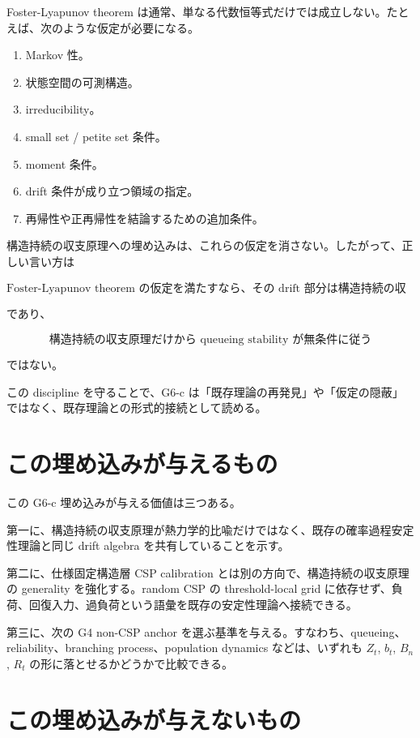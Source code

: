 \documentclass[12pt,a4paper]{article}
\begin{document}
Foster-Lyapunov theorem は通常、単なる代数恒等式だけでは成立しない。たとえば、次のような仮定が必要になる。

\begin{enumerate}
\def\labelenumi{\arabic{enumi}.}
\tightlist
\item
  Markov 性。
\item
  状態空間の可測構造。
\item
  irreducibility。
\item
  small set / petite set 条件。
\item
  moment 条件。
\item
  drift 条件が成り立つ領域の指定。
\item
  再帰性や正再帰性を結論するための追加条件。
\end{enumerate}

構造持続の収支原理への埋め込みは、これらの仮定を消さない。したがって、正しい言い方は

\[
\text{Foster-Lyapunov theorem の仮定を満たすなら、その drift 部分は構造持続の収支原理へ埋め込める}
\]

であり、

\[
\text{構造持続の収支原理だけから queueing stability が無条件に従う}
\]

ではない。

この discipline を守ることで、G6-c は「既存理論の再発見」や「仮定の隠蔽」ではなく、既存理論との形式的接続として読める。

\section{この埋め込みが与えるもの}\label{ux3053ux306eux57cbux3081ux8fbcux307fux304cux4e0eux3048ux308bux3082ux306e}

この G6-c 埋め込みが与える価値は三つある。

第一に、構造持続の収支原理が熱力学的比喩だけではなく、既存の確率過程安定性理論と同じ drift algebra を共有していることを示す。

第二に、仕様固定構造層 CSP calibration とは別の方向で、構造持続の収支原理の generality を強化する。random CSP の threshold-local grid に依存せず、負荷、回復入力、過負荷という語彙を既存の安定性理論へ接続できる。

第三に、次の G4 non-CSP anchor を選ぶ基準を与える。すなわち、queueing、reliability、branching process、population dynamics などは、いずれも \(Z_{t}\), \(b_{t}\), \(B_{n}\), \(R_{t}\) の形に落とせるかどうかで比較できる。

\section{この埋め込みが与えないもの}\label{ux3053ux306eux57cbux3081ux8fbcux307fux304cux4e0eux3048ux306aux3044ux3082ux306e}
\end{document}
